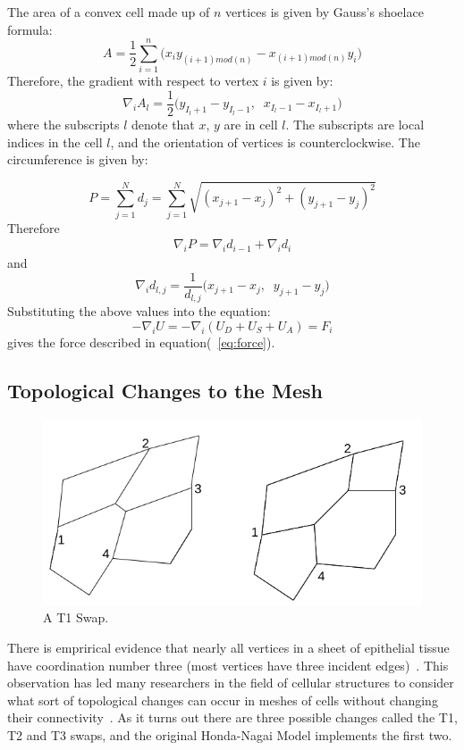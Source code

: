  The area of a convex cell made up of $n$ vertices is given by Gauss's shoelace formula:
\begin{equation}
A = \frac12\sum\limits_{i=1}^n\Big(x_iy_{(i+1)mod(n)}-x_{(i+1)mod(n)}y_i\Big)
\end{equation}
Therefore, the gradient with respect to vertex $i$ is given by:
\begin{equation}
\nabla_i A_l = \frac12
\Big(
y_{I_l+1} - y_{I_l-1},\;\;x_{I_l-1} - x_{I_l+1}
\Big)
\end{equation}
 where the subscripts $l$ denote that $x$, $y$ are in cell $l$. The subscripts are local indices in the cell $l$, and the orientation of vertices is counterclockwise. The circumference is given by:

\begin{equation}
P = \sum\limits_{j=1}^Nd_j = \sum\limits_{j=1}^N\sqrt{(x_{j+1} - x_j)^2 + (y_{j+1} - y_j)^2}
\end{equation}
Therefore
\begin{gather}
\nabla_iP = \nabla_id_{i-1} + \nabla_id_i
\end{gather}
and
\begin{equation}
\nabla_id_{l, j} = \frac1{d_{l, j}}
\Big(
x_{j+1}- x_j,\;\; y_{j+1} - y_j
\Big)
\end{equation}
Substituting the above values into the equation:
\begin{equation}
-\nabla_iU = -\nabla_i(U_D + U_S + U_A) = F_i
\end{equation}
gives the force described in equation(~\ref{eq:force}).

\subsection{Topological Changes to the Mesh}
\begin{figure}
    \centering
    \includegraphics[width=\textwidth, keepaspectratio]{../diagrams/t1.png}
    \caption{A T1 Swap.}
    \label{fig:t1}
\end{figure}
There is emprirical evidence that nearly all vertices in a sheet of epithelial tissue have coordination number three (most vertices have three incident edges)~\cite{EpithelialTopology}. This observation has led many researchers in the field of cellular structures to consider what sort of topological changes can occur in meshes of cells without changing their connectivity~\cite{Soap}.  As it turns out there are three possible changes called the T1, T2 and T3 swaps, and the original Honda-Nagai Model implements the first two.

